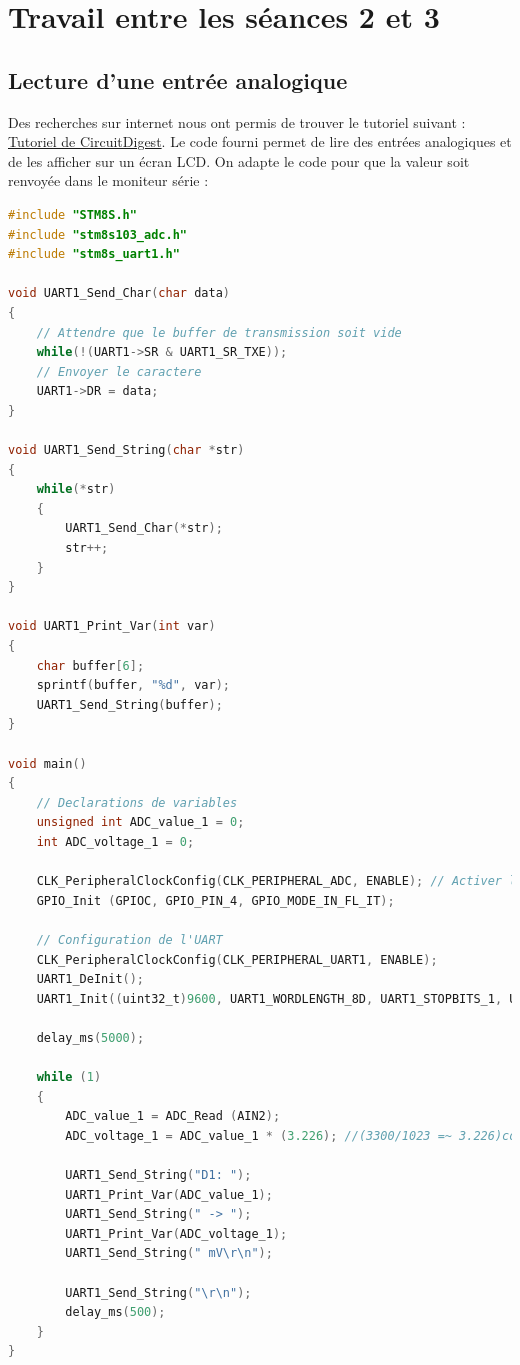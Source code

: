 \documentclass[11pt,a4paper]{article}
\begin{document}
\section{Travail entre les séances 2 et 3}
\subsection{Lecture d'une entrée analogique}
Des recherches sur internet nous ont permis de trouver le tutoriel suivant : \href{https://circuitdigest.com/microcontroller-projects/adc-on-stm8s-using-c-compiler-reading-multiple-adc-values-and-displaying-on-lcd}{Tutoriel de CircuitDigest}. Le code fourni permet de lire des entrées analogiques et de les afficher sur un écran LCD. On adapte le code pour que la valeur soit renvoyée dans le moniteur série :

\begin{lstlisting}[language=C]
#include "STM8S.h"
#include "stm8s103_adc.h"
#include "stm8s_uart1.h"

void UART1_Send_Char(char data)
{
    // Attendre que le buffer de transmission soit vide
    while(!(UART1->SR & UART1_SR_TXE));
    // Envoyer le caractere
    UART1->DR = data;
}

void UART1_Send_String(char *str)
{
    while(*str)
    {
        UART1_Send_Char(*str);
        str++;
    }
}

void UART1_Print_Var(int var)
{
    char buffer[6];
    sprintf(buffer, "%d", var);
    UART1_Send_String(buffer);
}

void main()
{
    // Declarations de variables
    unsigned int ADC_value_1 = 0;
    int ADC_voltage_1 = 0;

    CLK_PeripheralClockConfig(CLK_PERIPHERAL_ADC, ENABLE); // Activer l'horloge peripherique pour l'ADC
    GPIO_Init (GPIOC, GPIO_PIN_4, GPIO_MODE_IN_FL_IT);
    
    // Configuration de l'UART
    CLK_PeripheralClockConfig(CLK_PERIPHERAL_UART1, ENABLE);
    UART1_DeInit();
    UART1_Init((uint32_t)9600, UART1_WORDLENGTH_8D, UART1_STOPBITS_1, UART1_PARITY_NO, UART1_SYNCMODE_CLOCK_DISABLE, UART1_MODE_TX_ENABLE);

    delay_ms(5000);

    while (1)
    {
        ADC_value_1 = ADC_Read (AIN2);
        ADC_voltage_1 = ADC_value_1 * (3.226); //(3300/1023 =~ 3.226)convert ADC value 1 to 0 to 3300mV

        UART1_Send_String("D1: ");
        UART1_Print_Var(ADC_value_1);
        UART1_Send_String(" -> ");
        UART1_Print_Var(ADC_voltage_1);
        UART1_Send_String(" mV\r\n");

        UART1_Send_String("\r\n");
        delay_ms(500);
    }
}
\end{lstlisting}
\end{document}
